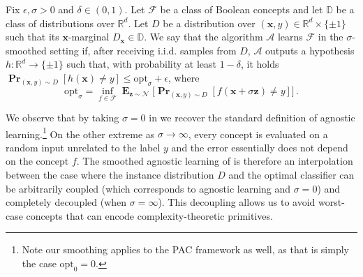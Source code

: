 \documentclass{theoretics}
\renewcommand\vec[1]{\mathbf{#1}}
\DeclareMathOperator*{\pr}{\mathbf{Pr}}
\DeclareMathOperator*{\E}{\mathbf{E}}
\newcommand{\normal}{\mathcal{N}}
\newcommand{\R}{\mathbb{R}}
\newcommand{\N}{\mathbb{N}}
\newcommand{\eps}{\epsilon}
\newcommand{\opt}{\mathrm{opt}}
\newcommand{\1}{\Ind}
\newcommand{\x}{\vec x}
\newcommand{\z}{\vec z}
\newcommand{\F}{\mathcal{F}}
\newcommand{\Gauss}{\mathcal{N}}
\newcommand{\Dmarginal}{D_{\x}}
\newcommand{\Djoint}{D}
\newcommand{\Alg}{\mathcal{A}}
\newcommand{\Dclass}{\mathbb{D}}
\begin{document}
\begin{definition}\label{definition:concept-smoothing} 
Fix $\eps, \sigma>0$ and $\delta\in (0,1)$.
Let $\F$ be a class of Boolean concepts and let $\Dclass$ be a class of distributions over $\R^d$.
    Let $\Djoint$ be a distribution over $(\x, y) \in \R^d\times \{\pm 1\}$ such that its $\x$-marginal $\Dmarginal\in \Dclass$.
    We say that the algorithm $\Alg$ learns $\F$ in the $\sigma$-smoothed setting if, after receiving i.i.d. samples from $\Djoint$, 
    $\Alg$ outputs a hypothesis $h:\R^d \to \{\pm 1\}$ such that,
    with probability at least $1-\delta$, it holds
        $\pr_{(\x, y) \sim \Djoint}[ h(\x) \neq y] \le 
        \opt_\sigma + \eps$,
        where 
    \begin{equation}\label{equation:concept-smoothing-goal}
    \opt_\sigma = 
    \inf_{f \in \mathcal F} 
    \E_{\z\sim\Gauss}
    \Big[
         \pr_{(\x, y) \sim \Djoint}[ f(\x + \sigma \z) \neq y ] 
         \Big]
         \,.
    \end{equation}
\end{definition}

We observe that by taking $\sigma = 0$ in  we recover the standard definition of agnostic learning.\footnote{Note our smoothing applies to the PAC framework as well, as that is simply the case $\opt_{0} = 0$.}  On the other extreme as $\sigma \to \infty$, every concept is 
evaluated on a random input unrelated to the label $y$ and the error essentially does not depend on the 
concept $f$. The smoothed agnostic learning of  is therefore an interpolation between the case where the instance distribution $D$ and the optimal classifier can be arbitrarily coupled (which corresponds to agnostic learning and $\sigma = 0$) and completely decoupled (when $\sigma = \infty$).  This decoupling allows us to avoid worst-case concepts that can encode complexity-theoretic primitives.  

\end{document}
